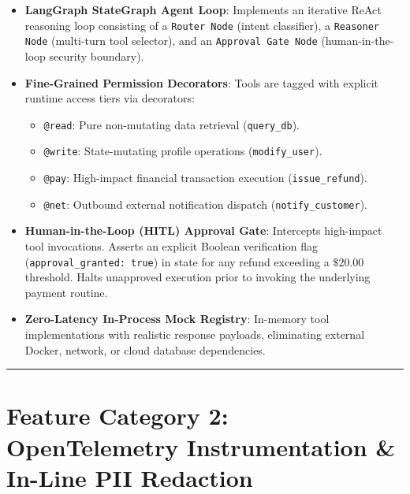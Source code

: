 \documentclass[10pt,a4paper]{article}
\begin{document}
\begin{itemize}[leftmargin=1.5em,noitemsep]
    \item \textbf{LangGraph StateGraph Agent Loop}: Implements an iterative ReAct reasoning loop consisting of a \texttt{Router Node} (intent classifier), a \texttt{Reasoner Node} (multi-turn tool selector), and an \texttt{Approval Gate Node} (human-in-the-loop security boundary).
    \item \textbf{Fine-Grained Permission Decorators}: Tools are tagged with explicit runtime access tiers via decorators:
    \begin{itemize}[noitemsep]
        \item \texttt{@read}: Pure non-mutating data retrieval (\texttt{query\_db}).
        \item \texttt{@write}: State-mutating profile operations (\texttt{modify\_user}).
        \item \texttt{@pay}: High-impact financial transaction execution (\texttt{issue\_refund}).
        \item \texttt{@net}: Outbound external notification dispatch (\texttt{notify\_customer}).
    \end{itemize}
    \item \textbf{Human-in-the-Loop (HITL) Approval Gate}: Intercepts high-impact tool invocations. Asserts an explicit Boolean verification flag (\texttt{approval\_granted: true}) in state for any refund exceeding a $\$20.00$ threshold. Halts unapproved execution prior to invoking the underlying payment routine.
    \item \textbf{Zero-Latency In-Process Mock Registry}: In-memory tool implementations with realistic response payloads, eliminating external Docker, network, or cloud database dependencies.
\end{itemize}

\vspace{0.4em}
\hrule
\vspace{0.6em}

\section{Feature Category 2: OpenTelemetry Instrumentation \& In-Line PII Redaction}
\end{document}
